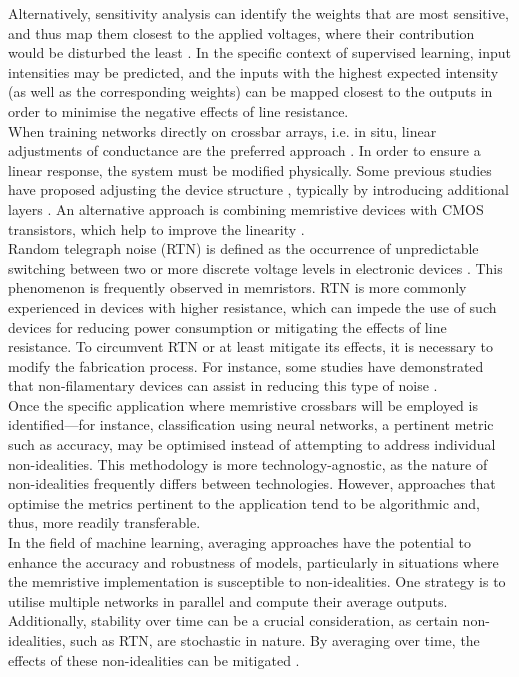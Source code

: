 \noindent Alternatively, sensitivity analysis can identify the weights that are most sensitive, and thus map them closest to the applied voltages, where their contribution would be disturbed the least \cite{agrawal2019x}. In the specific context of supervised learning, input intensities may be predicted, and the inputs with the highest expected intensity (as well as the corresponding weights) can be mapped closest to the outputs in order to minimise the negative effects of line resistance. \\

\noindent When training networks directly on crossbar arrays, i.e. in situ, linear adjustments of conductance are the preferred approach \cite{burr2015experimental}. In order to ensure a linear response, the system must be modified physically. Some previous studies have proposed adjusting the device structure \cite{woo2016improved}, typically by introducing additional layers \cite{wu2018methodology}. An alternative approach is combining memristive devices with CMOS transistors, which help to improve the linearity \cite{ambrogio2018equivalent}.\\

\noindent Random telegraph noise (RTN) is defined as the occurrence of unpredictable switching between two or more discrete voltage levels in electronic devices \cite{puglisi2016guidelines}. This phenomenon is frequently observed in memristors. RTN is more commonly experienced in devices with higher resistance, which can impede the use of such devices for reducing power consumption or mitigating the effects of line resistance. To circumvent RTN or at least mitigate its effects, it is necessary to modify the fabrication process. For instance, some studies have demonstrated that non-filamentary devices can assist in reducing this type of noise \cite{chai2018impact}. \\

\noindent Once the specific application where memristive crossbars will be employed is identified—for instance, classification using neural networks, a pertinent metric such as accuracy, may be optimised instead of attempting to address individual non-idealities. This methodology is more technology-agnostic, as the nature of non-idealities frequently differs between technologies. However, approaches that optimise the metrics pertinent to the application tend to be algorithmic and, thus, more readily transferable.\\

\noindent In the field of machine learning, averaging approaches have the potential to enhance the accuracy and robustness of models, particularly in situations where the memristive implementation is susceptible to non-idealities. One strategy is to utilise multiple networks in parallel and compute their average outputs. Additionally, stability over time can be a crucial consideration, as certain non-idealities, such as RTN, are stochastic in nature. By averaging over time, the effects of these non-idealities can be mitigated \cite{wan2020voltage}.\\

